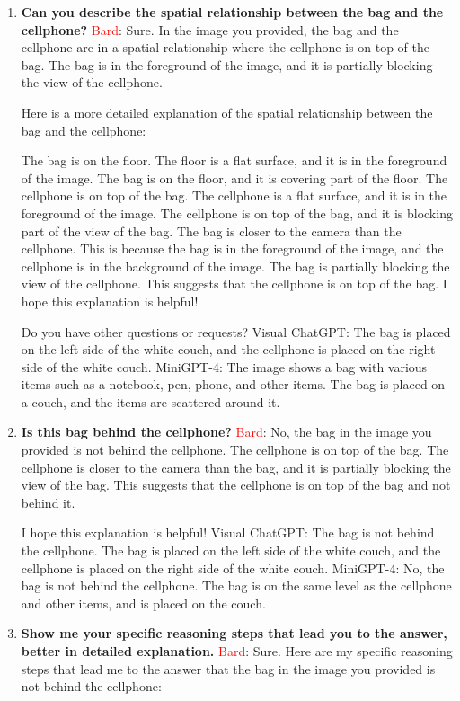 \begin{enumerate}
    \item \textbf{Can you describe the spatial relationship between the bag and the cellphone?}
    \subitem \textcolor{Red}{Bard}: Sure. In the image you provided, the bag and the cellphone are in a spatial relationship where the cellphone is on top of the bag. The bag is in the foreground of the image, and it is partially blocking the view of the cellphone.

    Here is a more detailed explanation of the spatial relationship between the bag and the cellphone:
    
    The bag is on the floor. The floor is a flat surface, and it is in the foreground of the image. The bag is on the floor, and it is covering part of the floor.
    The cellphone is on top of the bag. The cellphone is a flat surface, and it is in the foreground of the image. The cellphone is on top of the bag, and it is blocking part of the view of the bag.
    The bag is closer to the camera than the cellphone. This is because the bag is in the foreground of the image, and the cellphone is in the background of the image.
    The bag is partially blocking the view of the cellphone. This suggests that the cellphone is on top of the bag.
    I hope this explanation is helpful!
    
    Do you have other questions or requests?
    \subitem Visual ChatGPT: The bag is placed on the left side of the white couch, and the cellphone is placed on the right side of the white couch.
    \subitem MiniGPT-4: The image shows a bag with various items such as a notebook, pen, phone, and other items. The bag is placed on a couch, and the items are scattered around it.
    \item \textbf{Is this bag behind the cellphone?}
    \subitem \textcolor{Red}{Bard}: No, the bag in the image you provided is not behind the cellphone. The cellphone is on top of the bag. The cellphone is closer to the camera than the bag, and it is partially blocking the view of the bag. This suggests that the cellphone is on top of the bag and not behind it.

    I hope this explanation is helpful!
    \subitem Visual ChatGPT: The bag is not behind the cellphone. The bag is placed on the left side of the white couch, and the cellphone is placed on the right side of the white couch.
    \subitem MiniGPT-4: No, the bag is not behind the cellphone. The bag is on the same level as the cellphone and other items, and is placed on the couch.
    \item \textbf{Show me your specific reasoning steps that lead you to the answer, better in detailed explanation.}
    \subitem \textcolor{Red}{Bard}: 
    Sure. Here are my specific reasoning steps that lead me to the answer that the bag in the image you provided is not behind the cellphone:
    

\end{enumerate}
